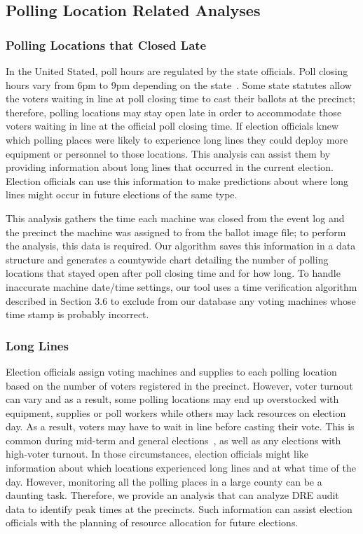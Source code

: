 \subsection{Polling Location Related Analyses}
\subsubsection{Polling Locations that Closed Late}
In the United Stated, poll hours are regulated by the state
officials. Poll closing hours vary from 6pm to 9pm depending on the
state~\cite{Info2007}. Some state statutes allow the voters waiting in
line at poll closing time to cast their ballots at the precinct;
therefore, polling locations may stay open late in order to
accommodate those voters waiting in line at the official poll closing
time. If election officials knew which polling places were likely to
experience long lines they could deploy more equipment or personnel to
those locations. This analysis can assist them by providing
information about long lines that occurred in the current election. Election
officials can use this information to make predictions about where
long lines might occur in future elections of the same type. 

This analysis gathers the time each machine was closed from the event log and the precinct the machine was assigned to from the ballot image file; to perform the analysis, this data is required.  Our algorithm saves this information in a data structure and generates a countywide chart detailing the number of polling locations that stayed open after poll closing time and for how long. To handle inaccurate machine date/time settings, our tool uses a time verification algorithm described in Section 3.6 to exclude from our database any voting machines whose time stamp is probably incorrect. 

\subsubsection{Long Lines}
Election officials assign voting machines and supplies to each polling
location based on the number of voters registered in the precinct.
However, voter turnout can vary and as a result, some polling
locations may end up overstocked with equipment, supplies or poll
workers while others may lack resources on election day. As a result,
voters may have to wait in line before casting their vote. This is
common during mid-term and general elections~\cite{Kreitman2010,
  Slade2008, U2010}, as well as any elections with high-voter turnout.
In those circumstances, election officials might like information
about which locations experienced long lines and at what time of the
day. However, monitoring all the polling places in a large county can
be a daunting task. Therefore, we provide an analysis that can analyze
DRE audit data to identify peak times at the precincts. Such
information can assist election officials with the planning of
resource allocation for future elections.

